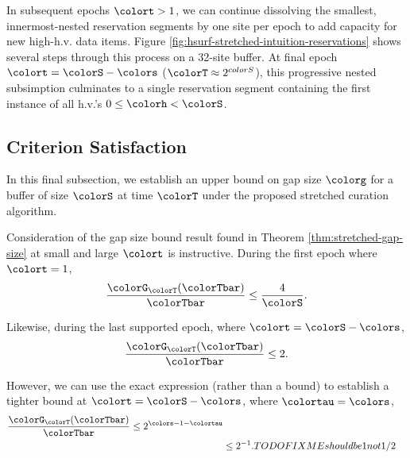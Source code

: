 In subsequent epochs $\colort>1$, we can continue dissolving the smallest, innermost-nested reservation segments by one site per epoch to add capacity for new high-h.v. data items.
Figure \ref{fig:hsurf-stretched-intuition-reservations} shows several steps through this process on a 32-site buffer.
At final epoch $\colort=\colorS-\colors$ ($\colorT \approx 2^{colorS}$), this progressive nested subsimption culminates to a single reservation segment containing the first instance of all h.v.'s $0 \leq \colorh < \colorS$.



\subsection{Criterion Satisfaction}

In this final subsection, we establish an upper bound on gap size $\colorg$ for a buffer of size $\colorS$ at time $\colorT$ under the proposed stretched curation algorithm.





Consideration of the gap size bound result found in Theorem \ref{thm:stretched-gap-size} at small and large $\colort$ is instructive.
During the first epoch where $\colort = 1$,
\begin{align*}
\frac{\colorG_{\colorT}(\colorTbar)}{\colorTbar}
\leq
\frac{4}{\colorS}.
\end{align*}

Likewise, during the last supported epoch, where $\colort = \colorS - \colors$,
\begin{align*}
\frac{\colorG_{\colorT}(\colorTbar)}{\colorTbar}
\leq
2.
\end{align*}

However, we can use the exact expression (rather than a bound) to establish a tighter bound at $\colort = \colorS - \colors$, where $\colortau = \colors$,
\begin{align*}
\frac{\colorG_{\colorT}(\colorTbar)}{\colorTbar}
\leq
2^{\colors - 1 - \colortau}\\
&\leq
2^{- 1}. TODO FIXME should be 1 not 1/2
\end{align*}

